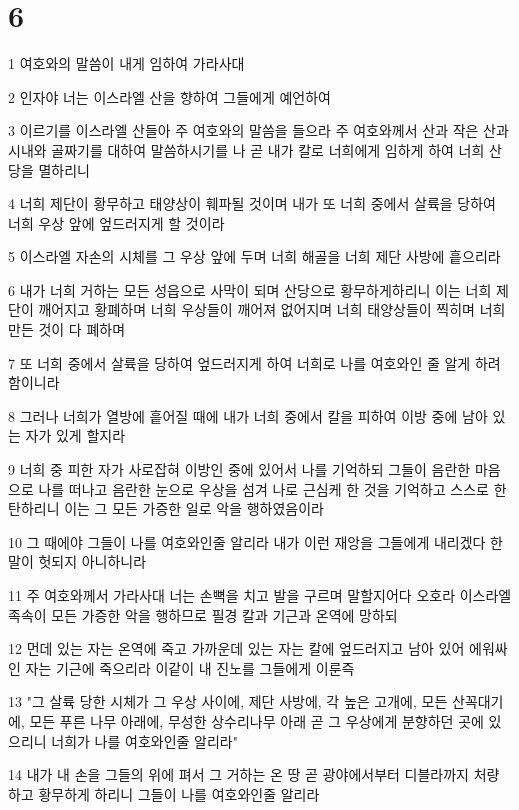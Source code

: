 \chapter{6}

\par 1 여호와의 말씀이 내게 임하여 가라사대
\par 2 인자야 너는 이스라엘 산을 향하여 그들에게 예언하여
\par 3 이르기를 이스라엘 산들아 주 여호와의 말씀을 들으라 주 여호와께서 산과 작은 산과 시내와 골짜기를 대하여 말씀하시기를 나 곧 내가 칼로 너희에게 임하게 하여 너희 산당을 멸하리니
\par 4 너희 제단이 황무하고 태양상이 훼파될 것이며 내가 또 너희 중에서 살륙을 당하여 너희 우상 앞에 엎드러지게 할 것이라
\par 5 이스라엘 자손의 시체를 그 우상 앞에 두며 너희 해골을 너희 제단 사방에 흩으리라
\par 6 내가 너희 거하는 모든 성읍으로 사막이 되며 산당으로 황무하게하리니 이는 너희 제단이 깨어지고 황폐하며 너희 우상들이 깨어져 없어지며 너희 태양상들이 찍히며 너희 만든 것이 다 폐하며
\par 7 또 너희 중에서 살륙을 당하여 엎드러지게 하여 너희로 나를 여호와인 줄 알게 하려 함이니라
\par 8 그러나 너희가 열방에 흩어질 때에 내가 너희 중에서 칼을 피하여 이방 중에 남아 있는 자가 있게 할지라
\par 9 너희 중 피한 자가 사로잡혀 이방인 중에 있어서 나를 기억하되 그들이 음란한 마음으로 나를 떠나고 음란한 눈으로 우상을 섬겨 나로 근심케 한 것을 기억하고 스스로 한탄하리니 이는 그 모든 가증한 일로 악을 행하였음이라
\par 10 그 때에야 그들이 나를 여호와인줄 알리라 내가 이런 재앙을 그들에게 내리겠다 한 말이 헛되지 아니하니라
\par 11 주 여호와께서 가라사대 너는 손뼉을 치고 발을 구르며 말할지어다 오호라 이스라엘 족속이 모든 가증한 악을 행하므로 필경 칼과 기근과 온역에 망하되
\par 12 먼데 있는 자는 온역에 죽고 가까운데 있는 자는 칼에 엎드러지고 남아 있어 에워싸인 자는 기근에 죽으리라 이같이 내 진노를 그들에게 이룬즉
\par 13 "그 살륙 당한 시체가 그 우상 사이에, 제단 사방에, 각 높은 고개에, 모든 산꼭대기에, 모든 푸른 나무 아래에, 무성한 상수리나무 아래 곧 그 우상에게 분향하던 곳에 있으리니 너희가 나를 여호와인줄 알리라"
\par 14 내가 내 손을 그들의 위에 펴서 그 거하는 온 땅 곧 광야에서부터 디블라까지 처량하고 황무하게 하리니 그들이 나를 여호와인줄 알리라

